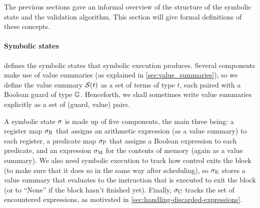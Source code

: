 {The previous sections gave an informal overview of the structure of the symbolic
state and the validation algorithm.  This section will give formal definitions
of these concepts.

\paragraph{Symbolic states}
 defines the symbolic states that symbolic
execution produces. Several components make use of value summaries (as explained
in \cref{sec:value_summaries}), so we define the value summary $\mathcal{S}(t)$
as a set of terms of type $t$, each paired with a Boolean guard of type
$\mathbb{G}$. Henceforth, we shall sometimes write value summaries explicitly as
a set of (guard, value) pairs.

A symbolic state $\sigma$ is made up of five components, the main three
being: a register map $\sigma_{\mathrm{R}}$ that assigns an arithmetic
expression (as a value summary) to each register, a predicate map
$\sigma_{\mathrm{P}}$ that assigns a Boolean expression to each
predicate, and an expression $\sigma_{\mathrm{M}}$ for the contents of memory
(again as a value summary).  We also need symbolic execution to track how
control exits the block (to make sure that it does so in the same way after
scheduling), so $\sigma_{\mathrm{E}}$ stores a value summary that evaluates
to the instruction that is executed to exit the block (or to \enquote{None} if
the block hasn't finished yet). Finally, $\sigma_{\mathrm{C}}$ tracks the
set of encountered expressions, as motivated in
\cref{sec:handling-discarded-expressions}.



}
